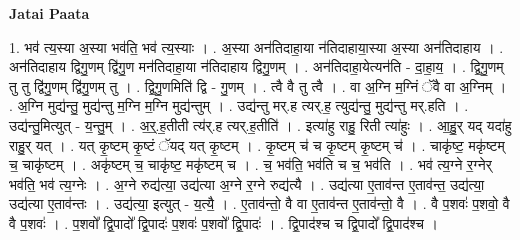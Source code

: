 \documentclass[17pt]{extarticle}
\begin{document}
\textbf{Jatai Paata} \newline

1. भव॑ त्य॒स्या अ॒स्या भव॑ति॒ भव॑ त्य॒स्याः । . अ॒स्या अन॑तिदाहा॒या न॑तिदाहाया॒स्या अ॒स्या अन॑तिदाहाय । . अन॑तिदाहाय द्विगु॒णम् द्वि॑गु॒ण मन॑तिदाहा॒या न॑तिदाहाय द्विगु॒णम् । . अन॑तिदाहा॒येत्यन॑ति - दा॒हा॒य॒ । . द्वि॒गु॒णम् तु तु द्वि॑गु॒णम् द्वि॑गु॒णम् तु । . द्वि॒गु॒णमिति॑ द्वि - गु॒णम् । . त्वै वै तु त्वै । . वा अ॒ग्नि म॒ग्निं ॅवै वा अ॒ग्निम् । . अ॒ग्नि मुद्य॑न्तु॒ मुद्य॑न्तु म॒ग्नि म॒ग्नि मुद्य॑न्तुम् । . उद्य॑न्तु मर्.ह त्यर्.ह॒ त्युद्य॑न्तु॒ मुद्य॑न्तु मर्.हति । . उद्य॑न्तु॒मित्युत् - य॒न्तु॒म् । . अ॒र्॒.ह॒तीती त्य॑र्.ह त्यर्.ह॒तीति॑ । . इत्या॑हु राहु॒ रिती त्या॑हुः । . आ॒हु॒र् यद् यदा॑हु राहु॒र् यत् । . यत् कृ॒ष्टम् कृ॒ष्टं ॅयद् यत् कृ॒ष्टम् । . कृ॒ष्टम् च॑ च कृ॒ष्टम् कृ॒ष्टम् च॑ । . चाकृ॑ष्ट॒ मकृ॑ष्टम् च॒ चाकृ॑ष्टम् । . अकृ॑ष्टम् च॒ चाकृ॑ष्ट॒ मकृ॑ष्टम् च । . च॒ भव॑ति॒ भव॑ति च च॒ भव॑ति । . भव॑ त्य॒ग्ने र॒ग्नेर् भव॑ति॒ भव॑ त्य॒ग्नेः । . अ॒ग्ने रुद्य॑त्या॒ उद्य॑त्या अ॒ग्ने र॒ग्ने रुद्य॑त्यै । . उद्य॑त्या ए॒ताव॑न्त ए॒ताव॑न्त॒ उद्य॑त्या॒ उद्य॑त्या ए॒ताव॑न्तः । . उद्य॑त्या॒ इत्युत् - य॒त्यै॒ । . ए॒ताव॑न्तो॒ वै वा ए॒ताव॑न्त ए॒ताव॑न्तो॒ वै । . वै प॒शवः॑ प॒शवो॒ वै वै प॒शवः॑ । . प॒शवो᳚ द्वि॒पादो᳚ द्वि॒पादः॑ प॒शवः॑ प॒शवो᳚ द्वि॒पादः॑ । . द्वि॒पाद॑श्च च द्वि॒पादो᳚ द्वि॒पाद॑श्च । \newline
\end{document}
